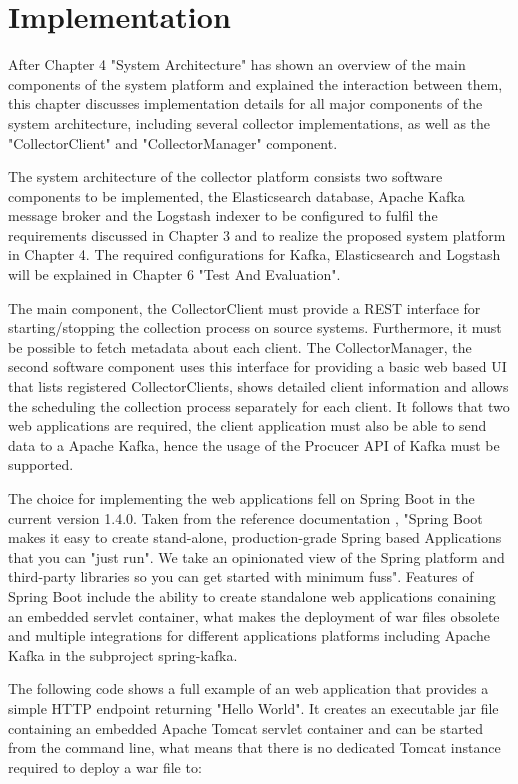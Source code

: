 \chapter{Implementation}

After Chapter 4 "System Architecture" has shown an overview of the main components of
the system platform and explained the interaction between them, this chapter discusses implementation
details for all major components of the system architecture, including several
collector implementations, as well as the "CollectorClient" and "CollectorManager" component.

The system architecture of the collector platform consists two software components to
be implemented, the Elasticsearch database, Apache Kafka message broker and the Logstash
indexer to be configured to fulfil the requirements discussed in Chapter 3 and to realize the
proposed system platform in Chapter 4. The required configurations for Kafka, Elasticsearch and Logstash
will be explained in Chapter 6 "Test And Evaluation".

The main component, the CollectorClient must provide a REST interface for starting/stopping the collection process
on source systems. Furthermore, it must be possible to fetch metadata about each client. The CollectorManager,
the second software component uses this interface for providing a basic web based UI that lists registered
CollectorClients, shows detailed client information and allows the scheduling the collection process separately
for each client. It follows that two web applications are required, the client application must also be able to
send data to a Apache Kafka, hence the usage of the Procucer API of Kafka must be supported.

The choice for implementing the web applications fell on Spring Boot in the current version 1.4.0. Taken from
the reference documentation \cite{SpringB16}, "Spring Boot makes it easy to create stand-alone, production-grade
Spring based Applications that you can "just run". We take an opinionated view of the Spring platform and
third-party libraries so you can get started with minimum fuss". Features of Spring Boot include the ability to create
standalone web applications conaining an embedded servlet container, what makes the deployment of war files obsolete
and multiple integrations for different applications platforms including Apache Kafka in the subproject spring-kafka.

The following code shows a full example of an web application that provides a simple
HTTP endpoint returning "Hello World". It creates an executable jar file containing
an embedded Apache Tomcat servlet container and can be started from the command line, what means that there is no
dedicated Tomcat instance required to deploy a war file to:

